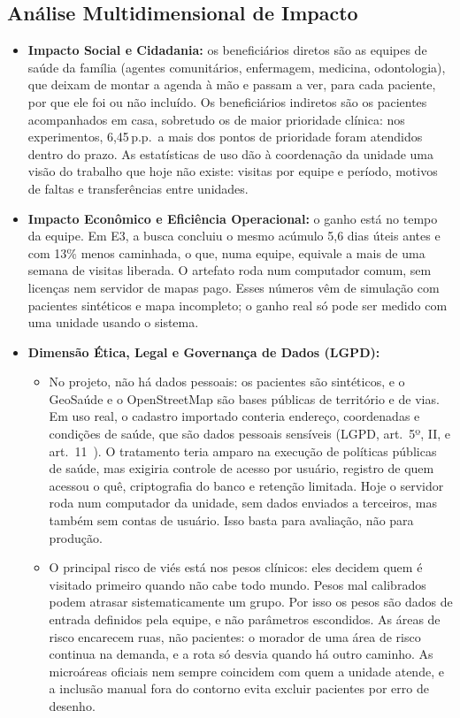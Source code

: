 \documentclass[11pt,a4paper]{article}
\newcommand{\pp}{\,p.p.}
\begin{document}
\subsection{Análise Multidimensional de Impacto}
\begin{itemize}
    \item \textbf{Impacto Social e Cidadania:} os beneficiários diretos são as equipes de saúde da família (agentes comunitários, enfermagem, medicina, odontologia), que deixam de montar a agenda à mão e passam a ver, para cada paciente, por que ele foi ou não incluído. Os beneficiários indiretos são os pacientes acompanhados em casa, sobretudo os de maior prioridade clínica: nos experimentos, 6,45\pp\ a mais dos pontos de prioridade foram atendidos dentro do prazo. As estatísticas de uso dão à coordenação da unidade uma visão do trabalho que hoje não existe: visitas por equipe e período, motivos de faltas e transferências entre unidades.
    \item \textbf{Impacto Econômico e Eficiência Operacional:} o ganho está no tempo da equipe. Em E3, a busca concluiu o mesmo acúmulo 5,6 dias úteis antes e com 13\% menos caminhada, o que, numa equipe, equivale a mais de uma semana de visitas liberada. O artefato roda num computador comum, sem licenças nem servidor de mapas pago. Esses números vêm de simulação com pacientes sintéticos e mapa incompleto; o ganho real só pode ser medido com uma unidade usando o sistema.
    \item \textbf{Dimensão Ética, Legal e Governança de Dados (LGPD):}
    \begin{itemize}
        \item No projeto, não há dados pessoais: os pacientes são sintéticos, e o GeoSaúde e o OpenStreetMap são bases públicas de território e de vias. Em uso real, o cadastro importado conteria endereço, coordenadas e condições de saúde, que são dados pessoais sensíveis (LGPD, art.~5º, II, e art.~11~\cite{lgpd}). O tratamento teria amparo na execução de políticas públicas de saúde, mas exigiria controle de acesso por usuário, registro de quem acessou o quê, criptografia do banco e retenção limitada. Hoje o servidor roda num computador da unidade, sem dados enviados a terceiros, mas também sem contas de usuário. Isso basta para avaliação, não para produção.
        \item O principal risco de viés está nos pesos clínicos: eles decidem quem é visitado primeiro quando não cabe todo mundo. Pesos mal calibrados podem atrasar sistematicamente um grupo. Por isso os pesos são dados de entrada definidos pela equipe, e não parâmetros escondidos. As áreas de risco encarecem ruas, não pacientes: o morador de uma área de risco continua na demanda, e a rota só desvia quando há outro caminho. As microáreas oficiais nem sempre coincidem com quem a unidade atende, e a inclusão manual fora do contorno evita excluir pacientes por erro de desenho.

\end{itemize}
\end{itemize}
\end{document}
